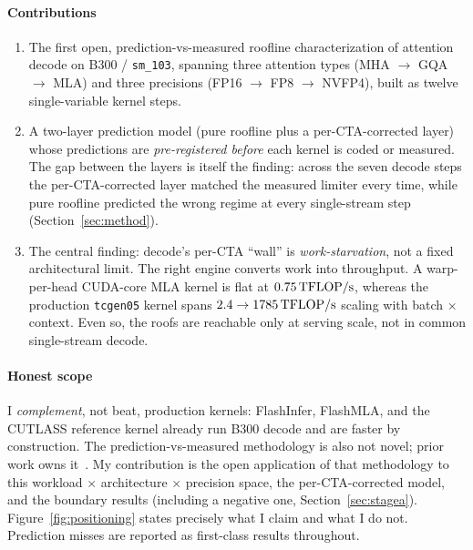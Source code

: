 \paragraph{Contributions}
\begin{enumerate}
  \item The first open, prediction-vs-measured roofline characterization of
  attention decode on B300 / \texttt{sm\_103}, spanning three attention types
  (MHA $\to$ GQA $\to$ MLA) and three precisions (FP16 $\to$ FP8 $\to$ NVFP4),
  built as twelve single-variable kernel steps.
  \item A two-layer prediction model (pure roofline plus a per-CTA-corrected
  layer) whose predictions are \emph{pre-registered before} each kernel is coded
  or measured. The gap between the layers is itself the finding: across the seven
  decode steps the per-CTA-corrected layer matched the measured limiter every
  time, while pure roofline predicted the wrong regime at every single-stream
  step (Section~\ref{sec:method}).
  \item The central finding: decode's per-CTA ``wall'' is
  \emph{work-starvation}, not a fixed architectural limit. The right engine
  converts work into throughput. A warp-per-head CUDA-core MLA kernel is flat at
  $0.75\,\text{TFLOP/s}$, whereas the production \texttt{tcgen05} kernel spans
  $2.4 \to 1785\,\text{TFLOP/s}$ scaling with batch $\times$ context. Even so, the roofs
  are reachable only at serving scale, not in common single-stream decode.
\end{enumerate}

\paragraph{Honest scope}
I \emph{complement}, not beat, production kernels: FlashInfer, FlashMLA, and the
CUTLASS reference kernel already run B300 decode and are faster by construction.
The prediction-vs-measured methodology is also not novel; prior work owns
it~\cite{roofmethod}. My contribution is the open application of that methodology
to this workload $\times$ architecture $\times$ precision space, the
per-CTA-corrected model, and the boundary results (including a negative one,
Section~\ref{sec:stagea}). Figure~\ref{fig:positioning} states precisely what I
claim and what I do not. Prediction misses are reported as first-class results
throughout.
